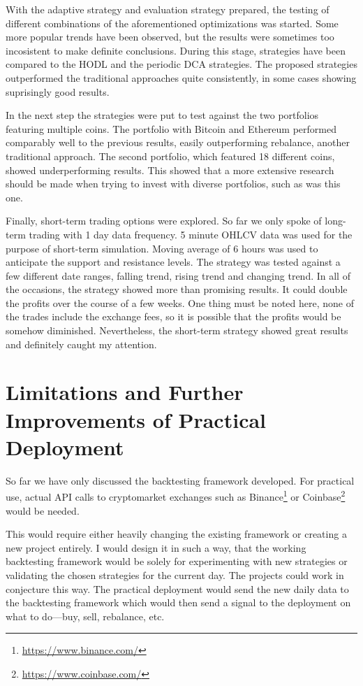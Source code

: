 With the adaptive strategy and evaluation strategy prepared, the testing of different combinations of the aforementioned optimizations was started. Some more popular trends have been observed, but the results were sometimes too incosistent to make definite conclusions. During this stage, strategies have been compared to the HODL and the periodic DCA strategies. The proposed strategies outperformed the traditional approaches quite consistently, in some cases showing suprisingly good results.

In the next step the strategies were put to test against the two portfolios featuring multiple coins. The portfolio with Bitcoin and Ethereum performed comparably well to the previous results, easily outperforming rebalance, another traditional approach. The second portfolio, which featured 18 different coins, showed underperforming results. This showed that a more extensive research should be made when trying to invest with diverse portfolios, such as was this one.

Finally, short-term trading options were explored. So far we only spoke of long-term trading with 1 day data frequency. 5 minute OHLCV data was used for the purpose of short-term simulation. Moving average of 6 hours was used to anticipate the support and resistance levels. The strategy was tested against a few different date ranges, falling trend, rising trend and changing trend. In all of the occasions, the strategy showed more than promising results. It could double the profits over the course of a few weeks. One thing must be noted here, none of the trades include the exchange fees, so it is possible that the profits would be somehow diminished. Nevertheless, the short-term strategy showed great results and definitely caught my attention.

\chapter{Limitations and Further Improvements of Practical Deployment}
\label{chapter-limitations-and-improvements}

So far we have only discussed the backtesting framework developed. For practical use, actual API calls to cryptomarket exchanges such as Binance\footnote{\url{https://www.binance.com/}} or Coinbase\footnote{\url{https://www.coinbase.com/}} would be needed.

This would require either heavily changing the existing framework or creating a new project entirely. I would design it in such a way, that the working backtesting framework would be solely for experimenting with new strategies or validating the chosen strategies for the current day. The projects could work in conjecture this way. The practical deployment would send the new daily data to the backtesting framework which would then send a signal to the deployment on what to do---buy, sell, rebalance, etc.

